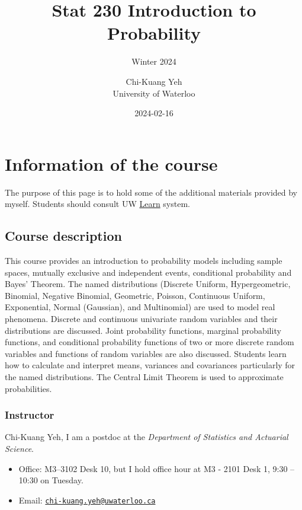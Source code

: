 \documentclass[
]{book}
\title{Stat 230 Introduction to Probability}
\subtitle{Winter 2024}
\author{Chi-Kuang Yeh\\
University of Waterloo}
\date{2024-02-16}
\providecommand{\tightlist}{%
  \setlength{\itemsep}{0pt}\setlength{\parskip}{0pt}}
\theoremstyle{definition}
\theoremstyle{definition}
\theoremstyle{definition}
\theoremstyle{definition}
\theoremstyle{remark}
\begin{document}
\maketitle

{
\setcounter{tocdepth}{1}
\tableofcontents
}
\hypertarget{information-of-the-course}{%
\chapter{Information of the course}\label{information-of-the-course}}

The purpose of this page is to hold some of the additional materials provided by myself. Students should consult UW \href{https://api-4ccc589b.duosecurity.com/frame/v4/preauth/healthcheck?sid=frameless-c0657e9d-cb86-4ac9-a6a7-fd054ae21fd5}{Learn} system.

\hypertarget{course-description}{%
\section{Course description}\label{course-description}}

This course provides an introduction to probability models including sample spaces, mutually exclusive and independent events, conditional probability and Bayes' Theorem. The named distributions (Discrete Uniform, Hypergeometric, Binomial, Negative Binomial, Geometric, Poisson, Continuous Uniform, Exponential, Normal (Gaussian), and Multinomial) are used to model real phenomena. Discrete and continuous univariate random variables and their distributions are discussed. Joint probability functions, marginal probability functions, and conditional probability functions of two or more discrete random variables and functions of random variables are also discussed. Students learn how to calculate and interpret means, variances and covariances particularly for the named distributions. The Central Limit Theorem is used to approximate probabilities.

\hypertarget{instructor}{%
\subsection{Instructor}\label{instructor}}

Chi-Kuang Yeh, I am a postdoc at the \emph{Department of Statistics and Actuarial Science}.

\begin{itemize}
\tightlist
\item
  Office: M3--3102 Desk 10, but I hold office hour at M3 - 2101 Desk 1, 9:30 -- 10:30 on Tuesday.
\item
  Email: \href{mailto:chi-kuang.yeh@uwaterloo.ca}{\nolinkurl{chi-kuang.yeh@uwaterloo.ca}}
\end{itemize}
\end{document}
